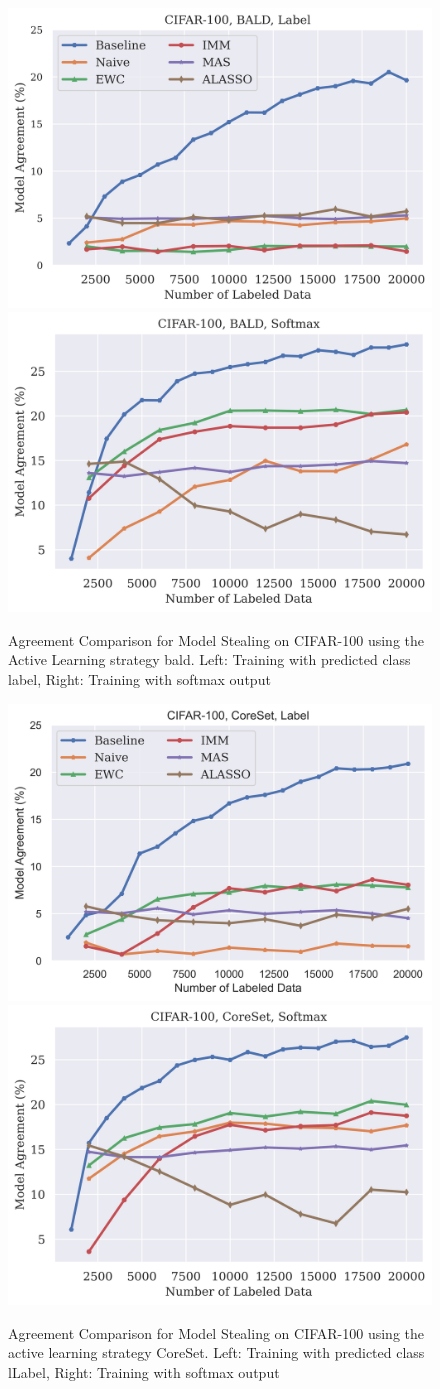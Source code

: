 \begin{figure}[!htb]
    \centering
    \includegraphics[width=0.48\linewidth]{images/results_CALMS/cifar100_label_bald.png} \hfill
    \includegraphics[width=0.48\linewidth]{images/results_CALMS/cifar100_softmax_bald.png}
    \caption{Agreement Comparison for Model Stealing on CIFAR-100 using the Active Learning strategy \gls{bald}. Left: Training with predicted class label,
    Right: Training with softmax output}
    \label{fig:CALMSCIFAR100BALD}
\end{figure}

\begin{figure}[!htb]
    \centering
    \includegraphics[width=0.48\linewidth]{images/results_CALMS/cifar100_label_coreset.png} \hfill
    \includegraphics[width=0.48\linewidth]{images/results_CALMS/cifar100_softmax_coreset.png}
    \caption{Agreement Comparison for Model Stealing on CIFAR-100 using the active learning strategy CoreSet. Left: Training with predicted class lLabel,
    Right: Training with softmax output}
    \label{fig:CALMSCIFAR100CoreSet}
\end{figure}

